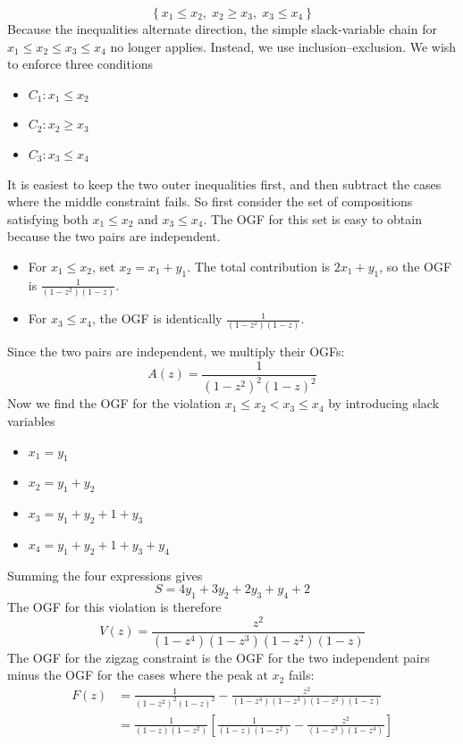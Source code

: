 \partsep
{}
\begin{equation*}
    \left\{x_{1}\leq x_{2},\; x_{2}\geq x_{3},\; x_{3}\leq x_{4}\right\}
\end{equation*}
Because the inequalities alternate direction, the simple slack-variable chain for $x_{1}\leq x_{2}\leq x_{3}\leq x_{4}$ no longer applies. Instead, we use inclusion--exclusion.
We wish to enforce three conditions
\begin{itemize}
    \item $C_{1}: x_{1}\leq x_{2}$
    \item $C_{2}: x_{2}\geq x_{3}$
    \item $C_{3}: x_{3}\leq x_{4}$
\end{itemize}
It is easiest to keep the two outer inequalities first, and then subtract the cases where the middle constraint fails.
So first consider the set of compositions satisfying both $x_{1}\leq x_{2}$ and $x_{3}\leq x_{4}$.
The OGF for this set is easy to obtain because the two pairs are independent.
\begin{itemize}
    \item For $x_{1}\leq x_{2}$, set $x_{2} = x_{1} + y_{1}$. The total contribution is $2x_{1} + y_{1}$,
        so the OGF is $\frac{1}{(1 - z^{2})(1 - z)}$.
    \item For $x_{3}\leq x_{4}$, the OGF is identically $\frac{1}{(1 - z^{2})(1 - z)}$.
\end{itemize}
Since the two pairs are independent, we multiply their OGFs:
\begin{equation*}
    A(z) = \frac{1}{(1 - z^{2})^{2}(1 - z)^{2}}
\end{equation*}
Now we find the OGF for the violation $x_{1}\leq x_{2} < x_{3}\leq x_{4}$ by introducing slack variables
\begin{itemize}
    \item $x_{1} = y_{1}$
    \item $x_{2} = y_{1} + y_{2}$
    \item $x_{3} = y_{1} + y_{2} + 1 + y_{3}$
    \item $x_{4} = y_{1} + y_{2} + 1 + y_{3} + y_{4}$
\end{itemize}
Summing the four expressions gives
\begin{equation*}
    S = 4y_{1} + 3y_{2} + 2y_{3} + y_{4} + 2
\end{equation*}
The OGF for this violation is therefore
\begin{equation*}
    V(z) = \frac{z^{2}}{(1 - z^{4})(1 - z^{3})(1 - z^{2})(1 - z)}
\end{equation*}
The OGF for the zigzag constraint is the OGF for the two independent pairs minus the OGF for the cases where the peak at $x_{2}$ fails:
\begin{equation*}
    \begin{aligned}
        F(z)
        &= \frac{1}{(1 - z^{2})^{2}(1 - z)^{2}} - \frac{z^{2}}{(1 - z^{4})(1 - z^{3})(1 - z^{2})(1 - z)} \\
        &= \frac{1}{(1 - z)(1 - z^{2})}\left[\frac{1}{(1 - z)(1 - z^{2})} - \frac{z^{2}}{(1 - z^{3})(1 - z^{4})}\right]
    \end{aligned}
\end{equation*}

